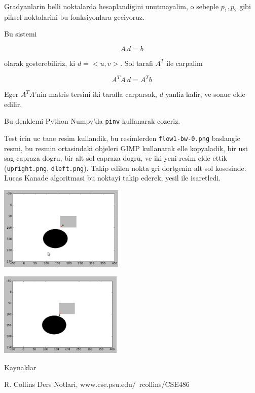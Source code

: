 \documentclass[12pt,fleqn]{article}
\begin{document}
Gradyanlarin belli noktalarda hesaplandigini unutmayalim, o sebeple $p_1,
p_2$ gibi piksel noktalarini bu fonksiyonlara geciyoruz. 

Bu sistemi

\[ A \ d = b \]

olarak gosterebiliriz, ki $d = <u,v>$. Sol tarafi $A^T$ ile carpalim

\[ A^TA \ d = A^Tb \]

Eger $A^TA$'nin matris tersini iki tarafla carparsak, $d$ yanliz kalir, ve
sonuc elde edilir. 

Bu denklemi Python Numpy'da \verb!pinv! kullanarak cozeriz.

Test icin uc tane resim kullandik, bu resimlerden \verb!flow1-bw-0.png!
baslangic resmi, bu resmin ortasindaki objeleri GIMP kullanarak elle
kopyaladik, bir ust sag capraza dogru, bir alt sol capraza dogru, ve iki
yeni resim elde ettik (\verb!upright.png!, \verb!dleft.png!). Takip edilen
nokta gri dortgenin alt sol kosesinde. Lucas Kanade algoritmasi bu noktayi
takip ederek, yesil ile isaretledi.

\includegraphics[height=4cm]{res1.png}

\includegraphics[height=4cm]{res2.png}





Kaynaklar

R. Collins Ders Notlari, www.cse.psu.edu/~rcollins/CSE486
\end{document}
